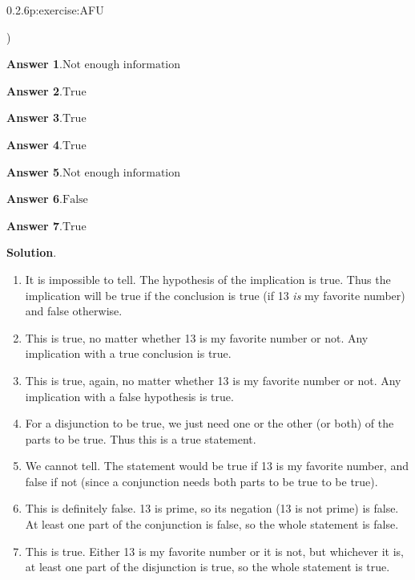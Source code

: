 \documentclass[twoside,11pt,]{book}
\newcommand{\blocktitlefont}{\relax}
\numberwithin{equation}{chapter}
\begin{document}
\begin{divisionsolution}{0.2.6}{}{p:exercise:AFU}
\begin{enumerate}[label=(\alph*)]
\begin{itemize*}[label=$\square$,leftmargin=3em,itemjoin=\hspace{1em}]
\end{itemize*})\quad
%
\end{enumerate}
%
\par\smallskip%
\noindent\textbf{\blocktitlefont Answer 1}.\quad{}\(\text{Not enough information}\)%
\par\smallskip%
\noindent\textbf{\blocktitlefont Answer 2}.\quad{}\(\text{True}\)%
\par\smallskip%
\noindent\textbf{\blocktitlefont Answer 3}.\quad{}\(\text{True}\)%
\par\smallskip%
\noindent\textbf{\blocktitlefont Answer 4}.\quad{}\(\text{True}\)%
\par\smallskip%
\noindent\textbf{\blocktitlefont Answer 5}.\quad{}\(\text{Not enough information}\)%
\par\smallskip%
\noindent\textbf{\blocktitlefont Answer 6}.\quad{}\(\text{False}\)%
\par\smallskip%
\noindent\textbf{\blocktitlefont Answer 7}.\quad{}\(\text{True}\)%
\par\smallskip%
\noindent\textbf{\blocktitlefont Solution}.\quad{}%
\begin{enumerate}[label=(\alph*)]
\item{}It is impossible to tell. The hypothesis of the implication is true. Thus the implication will be true if the conclusion is true (if 13 \emph{is} my favorite number) and false otherwise.%
\item{}This is true, no matter whether 13 is my favorite number or not. Any implication with a true conclusion is true.%
\item{}This is true, again, no matter whether 13 is my favorite number or not. Any implication with a false hypothesis is true.%
\item{}For a disjunction to be true, we just need one or the other (or both) of the parts to be true. Thus this is a true statement.%
\item{}We cannot tell. The statement would be true if 13 is my favorite number, and false if not (since a conjunction needs both parts to be true to be true).%
\item{}This is definitely false. 13 is prime, so its negation (13 is not prime) is false. At least one part of the conjunction is false, so the whole statement is false.%
\item{}This is true. Either 13 is my favorite number or it is not, but whichever it is, at least one part of the disjunction is true, so the whole statement is true.%
\end{enumerate}
%
\end{divisionsolution}%
\end{document}
